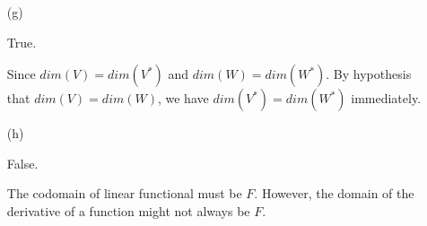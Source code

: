 \begin{Exercise}
\begin{enumerate}[(a)]
\item[(g)]
\begin{answer}
True.
\end{answer}
\begin{solution}
Since $dim(V)=dim(V^*)$ and $dim(W)=dim(W^*)$. By hypothesis that $dim(V)=dim(W)$, we have $dim(V^*)=dim(W^*)$ immediately.
\end{solution}

\item[(h)]
\begin{answer}
False.
\end{answer}
\begin{solution}
The codomain of linear functional must be $F$. However, the domain of the derivative of a function might not always be $F$.
\end{solution}

\end{enumerate}
\end{Exercise}